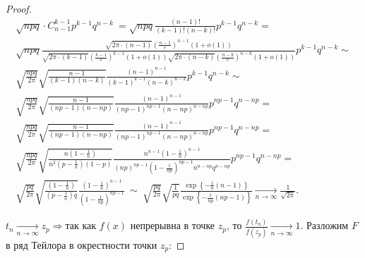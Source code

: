 \begin{proof}
\begin{gather*}
\sqrt{npq} \cdotp C_{n-1}^{k-1} p^{k-1} q^{n-k} \ =\sqrt{npq}\frac{( n-1) !}{( k-1) !( n-k) !} p^{k-1} q^{n-k} =\\ \sqrt{npq}\frac{\sqrt{2\pi \cdotp ( n-1)}\left(\frac{n-1}{e}\right)^{n-1}( 1+o( 1))}{\sqrt{2\pi \cdotp ( k-1)}\left(\frac{k-1}{e}\right)^{k-1}( 1+o( 1))\sqrt{2\pi \cdotp ( n-k)}\left(\frac{n-k}{e}\right)^{n-k}( 1+o( 1))} p^{k-1} q^{n-k}\sim\\ \sqrt{\frac{npq}{2\pi }}\sqrt{\frac{n-1}{( k-1)( n-k)}}\frac{( n-1)^{n-1}}{( k-1)^{k-1}( n-k)^{n-k}} p^{k-1} q^{n-k}\sim\\ \sqrt{\frac{npq}{2\pi }}\sqrt{\frac{n-1}{( np-1)( n-np)}}\frac{( n-1)^{n-1}}{( np-1)^{np-1}( n-np)^{n-np}} p^{np-1} q^{n-np} =\\ \sqrt{\frac{npq}{2\pi }}\sqrt{\frac{n-1}{( np-1)( n-np)}}\frac{( n-1)^{n-1}}{( np-1)^{np-1}( n-np)^{n-np}} p^{np-1} q^{n-np} =\\ \sqrt{\frac{npq}{2\pi }}\sqrt{\frac{n\left( 1-\frac{1}{n}\right)}{n^{2}\left( p-\frac{1}{n}\right)( 1-p)}}\frac{n^{n-1}\left( 1-\frac{1}{n}\right)^{n-1}}{( np)^{np-1}\left( 1-\frac{1}{np}\right)^{np-1} n^{n-np} q^{n-np}} p^{np-1} q^{n-np} =\\ \sqrt{\frac{pq}{2\pi }}\sqrt{\frac{\left( 1-\frac{1}{n}\right)}{\left( p-\frac{1}{n}\right) q}}\frac{\left( 1-\frac{1}{n}\right)^{n-1}}{\left( 1-\frac{1}{np}\right)^{np-1}} \ \sim \ \sqrt{\frac{pq}{2\pi }}\sqrt{\frac{1}{pq}}\frac{\exp\left\{-\frac{1}{n}( n-1)\right\}}{\exp\left\{-\frac{1}{np}( np-1)\right\}}\xrightarrow[n\rightarrow \infty ]{}\frac{1}{\sqrt{2\pi }} .
\end{gather*}


$\displaystyle t_{n}\xrightarrow[n\rightarrow \infty ]{} z_{p} \Rightarrow $так как $\displaystyle f( x)$ непрерывна в точке $\displaystyle z_{p}$, то $\displaystyle \frac{f( t_{n})}{f( z_{p})}\xrightarrow[n\rightarrow \infty ]{} 1$. Разложим $\displaystyle F$ в ряд Тейлора в окрестности точки $\displaystyle z_{p}$:



\end{proof}
